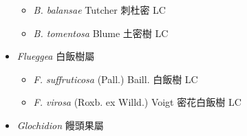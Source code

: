 \begin{itemize}
  \begin{itemize}
        \item[] \textit{B. balansae} Tutcher  刺杜密   LC
        \item[] \textit{B. tomentosa} Blume  土密樹   LC
  \end{itemize}
 \item[] \textit{Flueggea} 白飯樹屬
                                
  \begin{itemize}
        \item[] \textit{F. suffruticosa} (Pall.) Baill.  白飯樹   LC
        \item[] \textit{F. virosa} (Roxb. ex Willd.) Voigt  密花白飯樹   LC
  \end{itemize}
 \item[] \textit{Glochidion} 饅頭果屬
                                

\end{itemize}

